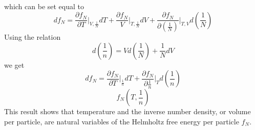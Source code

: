 \documentclass[double,12pt]{beavtex}
\begin{document}
which can be set equal to 
\begin{displaymath}df_N=\frac{\partial f_N}{\partial T}\bigg|_{V,\frac{1}{N}}dT 
+\frac{\partial f_N}{V}\bigg|_{T,\frac{1}{N}}dV + \frac{\partial f_N}
{\partial \left(\frac{1}{N}\right)}\bigg|_{T,V}d\left(\frac{1}{N}\right)\end{displaymath}
Using the relation
\begin{displaymath}d\left(\frac{1}{n}\right)=Vd\left(\frac{1}{N}\right)+\frac{1}{N}dV\end{displaymath}
we get
\begin{displaymath}df_N=\frac{\partial f_N}{\partial T}\bigg|_{\frac{1}{n}}dT 
+ \frac{\partial f_N}{\partial \frac{1}{n}}\bigg|_{T}d\left(\frac{1}{n}\right)\end{displaymath}
\begin{equation}f_N(T,\frac{1}{n})\end{equation}
This result shows that temperature and the inverse number density, 
or volume per particle, are natural variables of the Helmholtz free energy 
per particle $f_N$.
\end{document}
